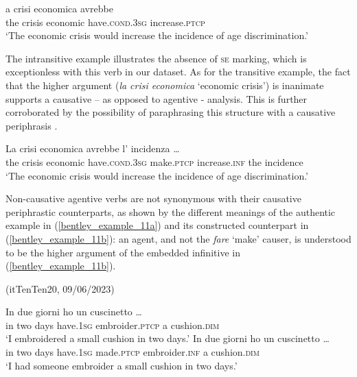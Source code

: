 \documentclass[output=paper,colorlinks,citecolor=brown
]{langscibook}
\begin{document}
\ea \label{bentley_example_9}
    \gll [L]a	crisi		economica	avrebbe 							  \\
    the		crisis	economic		have.\textsc{cond}.3\textsc{sg}	increase.\textsc{ptcp}\\
    \glt ‘The economic crisis would increase the incidence of age discrimination.’
\z

The intransitive example illustrates the absence of \textsc{se} marking, which is exceptionless with this verb in our dataset. As for the transitive example, the fact that the higher argument (\textit{la crisi economica} ‘economic crisis’) is inanimate supports a causative – as opposed to agentive - analysis. This is further corroborated by the possibility of paraphrasing this structure with a causative periphrasis \citep[26—27 and references therein]{zribi1987reflexivite}.

\ea \label{bentley_example_10}
    \gll La	crisi		economica	avrebbe 							  l’ {incidenza \ldots }\\
    				the	crisis	economic		have.\textsc{cond}.3\textsc{sg}	make.\textsc{ptcp}	increase.\textsc{inf}	the incidence\\
    \glt  	‘The economic crisis would increase the incidence of age discrimination.’
\z

Non-causative agentive verbs are not synonymous with their causative periphrastic counterparts, as shown by the different meanings of the authentic example in (\ref{bentley_example_11a}) and its constructed counterpart in (\ref{bentley_example_11b}): an agent, and not the \textit{fare} ‘make’ causer, is understood to be the higher argument of the embedded infinitive in (\ref{bentley_example_11b}).

\hspace*{\fill}(itTenTen20, 09/06/2023)\quad

\ea \label{bentley_example_11}
    \ea \label{bentley_example_11a}
    \gll In	due	giorni	ho												un cuscinetto \ldots  \\
    in	two	days			have.1\textsc{sg}	embroider.\textsc{ptcp}	a			cushion.\textsc{dim}\\
    \glt ‘I embroidered a small cushion in two days.’
    \ex \label{bentley_example_11b}
    \gll In	due	giorni	ho																	un	cuscinetto \ldots  \\
   	in	two	days			have.1\textsc{sg}	made.\textsc{ptcp}	embroider.\textsc{inf}		a			cushion.\textsc{dim} \\
    \glt ‘I had someone embroider a small cushion in two days.’
    \z
\z
\end{document}
